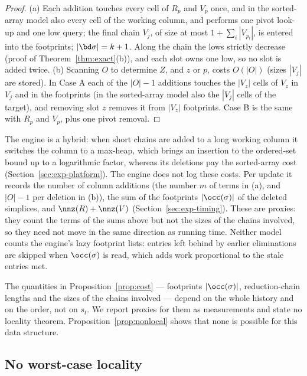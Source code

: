 \begin{proof}
(a) Each addition touches every cell of $R_p$ and $V_p$ once, and in the
sorted-array model also every cell of the working column, and performs one
pivot look-up and one low query; the final chain $V_j$, of size at most
$1+\sum_i|V_{p_i}|$, is entered into the footprints; $|\bd\sigma|=k+1$. Along
the chain the lows strictly decrease (proof of Theorem~\ref{thm:exact}(b)), and
each slot owns one low, so no slot is added twice.
(b) Scanning $O$ to determine $Z$, and $z$ or $p$, costs $O(|O|)$ (sizes $|V_j|$
are stored). In Case A each of the $|O|-1$ additions touches the $|V_z|$ cells of
$V_z$ in $V_j$ and in the footprints (in the sorted-array model also the
$|V_j|$ cells of the target), and removing slot $z$ removes it from $|V_z|$
footprints. Case B is the same with $R_p$ and $V_p$, plus one pivot removal.
\end{proof}

The engine is a hybrid: when short chains are added to a long working column it
switches the column to a max-heap, which brings an insertion to the
ordered-set bound up to a logarithmic factor, whereas its deletions pay the
sorted-array cost (Section~\ref{sec:exp-platform}). The engine does not log
these costs. Per update it records the number of column additions (the number
$m$ of terms in (a), and $|O|-1$ per deletion in (b)), the sum of the
footprints $|\occ(\sigma)|$ of the deleted simplices, and $\nnz(R)+\nnz(V)$
(Section~\ref{sec:exp-timing}). These are proxies: they count the terms of the
sums above but not the sizes of the chains involved, so they need not move in
the same direction as running time. Neither model counts the engine's lazy
footprint lists: entries left behind by earlier eliminations are skipped when
$\occ(\sigma)$ is read, which adds work proportional to the stale entries met.

The quantities in Proposition~\ref{prop:cost} --- footprints $|\occ(\sigma)|$,
reduction-chain lengths and the sizes of the chains involved --- depend on the
whole history and on the order, not on $s_t$. We report proxies for them as
measurements and state no locality theorem. Proposition~\ref{prop:nonlocal}
shows that none is possible for this data structure.

\subsection{No worst-case locality}\label{sec:nonlocal}

